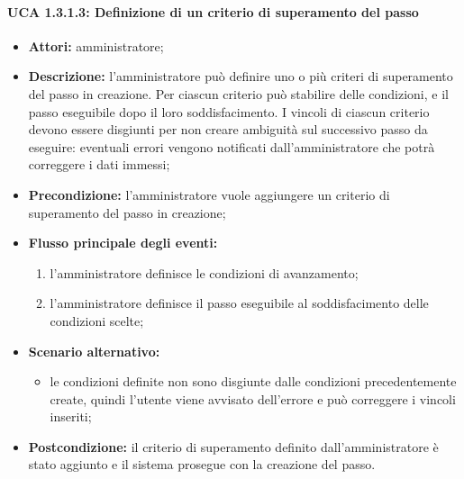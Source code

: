 \paragraph{UCA 1.3.1.3: Definizione di un criterio di superamento del passo}
\begin{itemize}
\item \textbf{Attori:} 
amministratore;
\item \textbf{Descrizione:}
l'amministratore può definire uno o più criteri di superamento del passo in creazione.
Per ciascun criterio può stabilire delle condizioni, e il passo eseguibile dopo il loro soddisfacimento.
I vincoli di ciascun criterio devono essere disgiunti per non creare ambiguità sul successivo passo da eseguire: eventuali errori vengono notificati dall'amministratore che potrà correggere i dati immessi; 
\item \textbf{Precondizione:} 
l'amministratore vuole aggiungere un criterio di superamento del passo in creazione;
\item \textbf{Flusso principale degli eventi:} 
\begin{enumerate}
\item l'amministratore definisce le condizioni di avanzamento;
\item l'amministratore definisce il passo eseguibile al soddisfacimento delle condizioni scelte;
\end{enumerate}
\item \textbf{Scenario alternativo:}
\begin{itemize}
\item le condizioni definite non sono disgiunte dalle condizioni precedentemente create, quindi l'utente viene avvisato dell'errore e può correggere i vincoli inseriti;
\end{itemize}
\item \textbf{Postcondizione:}
il criterio di superamento definito dall'amministratore è stato aggiunto e il sistema prosegue con la creazione del passo.
\end{itemize}

